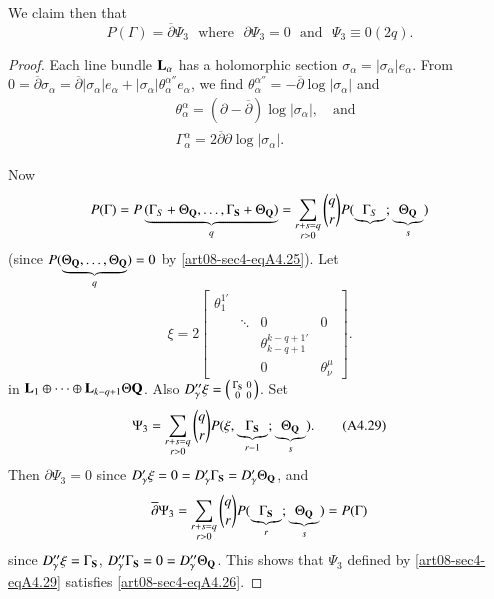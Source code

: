 We claim then that
\begin{equation*}
P(\Gamma)=\overline{\partial}\Psi_{3}\text{~ where~ } \partial \Psi_{3}=0\text{~ and~ }\Psi_{3}\equiv 0(2q).\tag{A4.26}\label{art08-sec4-eqA4.26}
\end{equation*}

\begin{proof}
Each line bundle $\mathbf{L}_{\alpha}$ has a holomorphic section $\sigma_{\alpha}=|\sigma_{\alpha}|e_{\alpha}$. From $0=\overline{\partial}\sigma_{\alpha}=\overline{\partial}|\sigma_{\alpha}|e_{\alpha}+|\sigma_{\alpha}|\theta^{\alpha''}_{\alpha}e_{\alpha}$, we find $\theta^{\alpha''}_{\alpha}=-\overline{\partial}\log |\sigma_{\alpha}|$ and 
\begin{align*}
& \theta^{\alpha}_{\alpha}=(\partial - \overline{\partial})\log |\sigma_{\alpha}|,\quad\text{and}\tag{A4.27}\label{art08-sec4-eqA4.27}\\[3pt]
& \Gamma^{\alpha}_{\alpha}=2\overline{\partial}\partial \log |\sigma_{\alpha}|.\tag{A4.28}\label{art08-sec4-eqA4.28}
\end{align*}

Now\pageoriginale 
$$
P(\Gamma)=P\underbrace{(\Gamma_{S}+\Theta_{\mathbf{Q}},\ldots,\Gamma_{\mathbf{S}}+\Theta_{\mathbf{Q}})}_{q}=\sum\limits_{\substack{r+s=q\\ r>0}}\binom{q}{r}P(\underbrace{\Gamma_{S}};\underbrace{\Theta_{\mathbf{Q}}}_{s})
$$ 
(since $P(\underbrace{\Theta_{\mathbf{Q}},\ldots,\Theta_{\mathbf{Q}}}_{q})=0$ by \eqref{art08-sec4-eqA4.25}). 
Let 
$$
\xi=2\left[\begin{array}{llll} \theta^{1'}_{1} & &\\
 & \ddots & 0 & 0\\
 & &\theta^{k-q+1'}_{k-q+1} &\\
 & & 0 & \theta^{\mu}_{\nu}
 \end{array}\right].
$$
in $\mathbf{L}_{1}\oplus\cdots\oplus \mathbf{L}_{k-q+1}\Theta\mathbf{Q}$. Also $D''_{\gamma}\xi=\left(\begin{smallmatrix} \Gamma_{\mathbf{S}} & 0\\ 0 & 0\end{smallmatrix}\right)$. Set
\begin{equation*}
\Psi_{3}=\sum\limits_{\substack{r+s=q\\ r>0}}\binom{q}{r}P(\xi,\underbrace{\Gamma_{\mathbf{S}}}_{r-1};\underbrace{\Theta_{\mathbf{Q}}}_{s}).\tag{A4.29}\label{art08-sec4-eqA4.29}
\end{equation*}
Then $\partial \Psi_{3}=0$ since $D'_{\gamma}\xi=0=D'_{\gamma}\Gamma_{\mathbf{S}}=D'_{\gamma}\Theta_{\mathbf{Q}}$, and 
$$
\overline{\partial}\Psi_{3}=\sum\limits_{\substack{r+s=q\\ r>0}}\binom{q}{r}P(\underbrace{\Gamma_{\mathbf{S}}}_{r};\underbrace{\Theta_{\mathbf{Q}}}_{s})=P(\Gamma)
$$ 
since $D''_{\gamma}\xi=\Gamma_{\mathbf{S}}$, $D''_{\gamma}\Gamma_{\mathbf{S}}=0=D''_{\gamma}\Theta_{\mathbf{Q}}$.
This shows that $\Psi_{3}$ defined by \eqref{art08-sec4-eqA4.29} satisfies \eqref{art08-sec4-eqA4.26}.


\end{proof}
